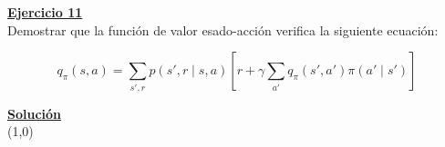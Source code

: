 \indent\underline{\textbf{Ejercicio 11}}\\
Demostrar que la función de valor esado-acción verifica la siguiente ecuación:

\[
    q_{\pi}(s,a) = \sum_{s',r} p(s',r \mid s,a)\left[ r + \gamma \sum_{a'} q_{\pi} (s',a') \pi (a' \mid s') \right]
\]

\indent\underline{\textbf{Solución}}\\

\line(1,0){\textwidth}

